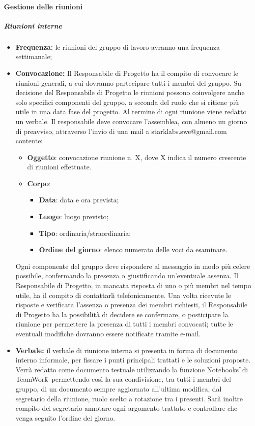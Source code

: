 \paragraph{Gestione delle riunioni}
\subparagraph{Riunioni interne}
\begin{itemize}
\item \textbf{Frequenza:} le riunioni del gruppo di lavoro avranno una frequenza settimanale; 

\item \textbf{Convocazione:} Il Responsabile di Progetto ha il compito di convocare le riunioni generali, a 
cui dovranno partecipare tutti i membri del gruppo.
Su decisione del Responsabile di Progetto le riunioni possono coinvolgere anche 
solo specifici componenti del gruppo, a seconda del ruolo che si ritiene più 
utile in una data fase del progetto. Al termine di ogni riunione viene redatto 
un verbale.
Il responsabile deve convocare l'assemblea, con almeno un giorno di preavviso, 
attraverso l'invio di una mail a starklabs.swe@gmail.com contente:
\begin{itemize}
\item \textbf{Oggetto}: convocazione riunione n. X, dove X indica il numero 
crescente di 
riunioni effettuate.
\item \textbf{Corpo}: 
\begin{itemize}
	\item \textbf{Data}: data e ora prevista;
	\item \textbf{Luogo}: luogo previsto;
	\item \textbf{Tipo}: ordinaria/straordinaria;
	\item \textbf{Ordine del giorno}: elenco numerato delle voci da esaminare.
\end{itemize}
\end{itemize}

Ogni componente del gruppo deve rispondere al messaggio in modo più celere 
possibile, confermando la presenza o giustificando un'eventuale assenza. Il 
Responsabile di Progetto, in mancata risposta di uno o più membri nel tempo 
utile, ha il compito di contattarli telefonicamente. Una volta ricevute le 
risposte e verificata l'assenza o presenza dei membri richiesti, il 
Responsabile di Progetto ha la possibilità di decidere se confermare, o 
posticipare la riunione per permettere la presenza di tutti i membri convocati; 
tutte le eventuali modifiche dovranno essere notificate tramite e-mail. 

\item \textbf{Verbale:} il verbale di riunione interna si presenta in forma di documento interno 
informale, per fissare i punti principali trattati e le soluzioni proposte. Verrà redatto come documento testuale utilizzando la funzione Notebooks\G\ di 
TeamWork\G\, permettendo così la sua condivisione, tra tutti i membri del 
gruppo, di un documento sempre aggiornato all'ultima modifica, dal segretario della riunione, ruolo scelto a rotazione tra i 
presenti. Sarà inoltre compito del segretario annotare ogni argomento trattato e controllare che venga seguito 
l'ordine del giorno.

\end{itemize}

